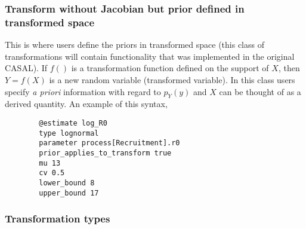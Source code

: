 \subsubsection*{Transform without Jacobian but prior defined in transformed space}
This is where users define the priors in transformed space (this class of transformations will contain functionality that was implemented in the original CASAL). If $f()$ is a transformation function defined on the support of $X$, then $Y = f(X)$ is a new random variable (transformed variable). In this class users specify \textit{a priori} information with regard to $p_Y(y)$ and $X$ can be thought of as a derived quantity. An example of this syntax,

{\small{\begin{verbatim}
		@estimate log_R0
		type lognormal
		parameter process[Recruitment].r0
		prior_applies_to_transform true
		mu 13
		cv 0.5
		lower_bound 8
		upper_bound 17		 	
		\end{verbatim}}}


\subsubsection*{Transformation types}


